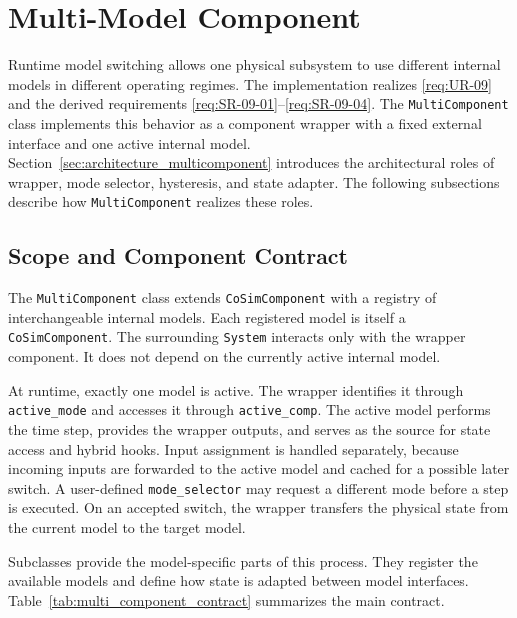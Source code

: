 \section{Multi-Model Component}
\label{sec:impl_multi_model}

Runtime model switching allows one physical subsystem to use different internal models in different operating regimes.
The implementation realizes \ref{req:UR-09} and the derived requirements \ref{req:SR-09-01}--\ref{req:SR-09-04}.
The \texttt{MultiComponent} class implements this behavior as a component wrapper with a fixed external interface and one active internal model.
Section~\ref{sec:architecture_multicomponent} introduces the architectural roles of wrapper, mode selector, hysteresis, and state adapter.
The following subsections describe how \texttt{MultiComponent} realizes these roles.

\subsection{Scope and Component Contract}
\label{sec:impl_multi_model_scope}

The \texttt{MultiComponent} class extends \texttt{CoSimComponent} with a registry of interchangeable internal models.
Each registered model is itself a \texttt{CoSimComponent}.
The surrounding \texttt{System} interacts only with the wrapper component.
It does not depend on the currently active internal model.

At runtime, exactly one model is active.
The wrapper identifies it through \texttt{active\_mode} and accesses it through \texttt{active\_comp}.
The active model performs the time step, provides the wrapper outputs, and serves as the source for state access and hybrid hooks.
Input assignment is handled separately, because incoming inputs are forwarded to the active model and cached for a possible later switch.
A user-defined \texttt{mode\_selector} may request a different mode before a step is executed.
On an accepted switch, the wrapper transfers the physical state from the current model to the target model.

Subclasses provide the model-specific parts of this process.
They register the available models and define how state is adapted between model interfaces.
Table~\ref{tab:multi_component_contract} summarizes the main contract.

